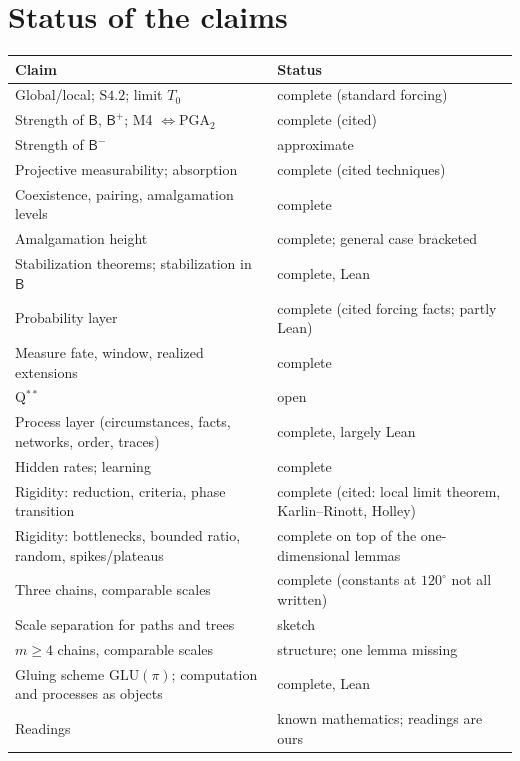 \documentclass[11pt]{article}
\theoremstyle{definition}
\theoremstyle{remark}
\newcommand{\B}{\mathsf{B}}
\newcommand{\Bm}{\mathsf{B}^{-}}
\newcommand{\Bp}{\mathsf{B}^{+}}
\newcommand{\GLU}{\mathrm{GLU}}
\begin{document}
\section{Status of the claims}\label{sec:ledger}

\begin{longtable}{p{}p{}}
\toprule
Claim & Status\\
\midrule\endhead
Global/local; $\mathrm{S4.2}$; limit $T_0$ & complete (standard forcing)\\
Strength of $\B$, $\Bp$; M4 $\Leftrightarrow\mathrm{PGA}_2$ & complete (cited)\\
Strength of $\Bm$ & approximate\\
Projective measurability; absorption & complete (cited techniques)\\
Coexistence, pairing, amalgamation levels & complete\\
Amalgamation height & complete; general case bracketed\\
Stabilization theorems; stabilization in $\B$ & complete, Lean\\
Probability layer & complete (cited forcing facts; partly Lean)\\
Measure fate, window, realized extensions & complete\\
Q$^{**}$ & open\\
Process layer (circumstances, facts, networks, order, traces) & complete, largely Lean\\
Hidden rates; learning & complete\\
Rigidity: reduction, criteria, phase transition & complete (cited: local limit theorem, Karlin--Rinott, Holley)\\
Rigidity: bottlenecks, bounded ratio, random, spikes/plateaus & complete on top of the one-dimensional lemmas\\
Three chains, comparable scales & complete (constants at $120^\circ$ not all written)\\
Scale separation for paths and trees & sketch\\
$m\ge4$ chains, comparable scales & structure; one lemma missing\\
Gluing scheme $\GLU(\pi)$; computation and processes as objects & complete, Lean\\
Readings & known mathematics; readings are ours\\
\bottomrule
\end{longtable}
\end{document}
